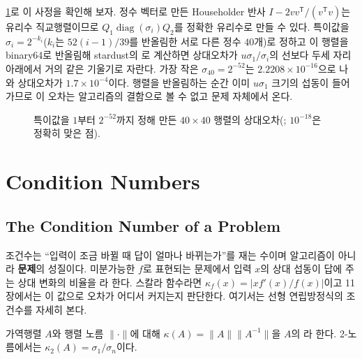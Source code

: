 \cref{fig:svd-err}로 이 사정을 확인해 보자. 정수 벡터로 만든 Householder 반사 $I-2vv^{\mathsf T}/(v^{\mathsf T}v)$는 유리수 직교행렬이므로 $Q_1\operatorname{diag}(\sigma_i)Q_2$를 정확한 유리수로 만들 수 있다. 특이값을 $\sigma_i=2^{-k_i}$($k_i$는 $52(i-1)/39$를 반올림한 서로 다른 정수 $40$개)로 정하고 이 행렬을 binary64로 반올림해 stardust의 로 계산하면 상대오차가 $u\sigma_1/\sigma_i$의 선보다 두세 자리 아래에서 거의 같은 기울기로 자란다. 가장 작은 $\sigma_{40}=2^{-52}$는 $2.2208\times10^{-16}$으로 나와 상대오차가 $1.7\times10^{-4}$이다. 행렬을 반올림하는 순간 이미 $u\sigma_1$ 크기의 섭동이 들어가므로 이 오차는 알고리즘의 결함으로 볼 수 없고 문제 자체에서 온다.

\begin{figure}[htbp]
\centering
{}
\caption{특이값을 $1$부터 $2^{-52}$까지 정해 만든 $40\times40$ 행렬의  상대오차(; $10^{-18}$은 정확히 맞은 점).}
\label{fig:svd-err}
\end{figure}


\section{Condition Numbers}
\label{sec:condition}

\subsection{The Condition Number of a Problem}

조건수는 ``입력이 조금 바뀔 때 답이 얼마나 바뀌는가''를 재는 수이며 알고리즘이 아니라 \textbf{문제}의 성질이다. 미분가능한 $f$로 표현되는 문제에서 입력 $x$의 상대 섭동이 답에 주는 상대 변화의 비율을 라 한다. 스칼라 함수라면 $\kappa_f(x)=|xf'(x)/f(x)|$이고 11장에서는 이 값으로 오차가 어디서 커지는지 판단한다. 여기서는 선형 연립방정식의 조건수를 자세히 본다.

\begin{definition}
\label{def:cond}
가역행렬 $A$와 행렬 노름 $\|\cdot\|$에 대해 $\kappa(A)=\|A\|\|A^{-1}\|$을 $A$의 라 한다. 2-노름에서는 $\kappa_2(A)=\sigma_1/\sigma_n$이다.
\end{definition}

